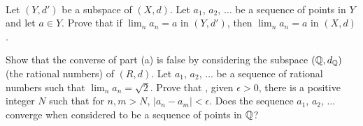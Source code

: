 \ea


\begin{comment}

\ExerciseSolution

\ba
\item Suppose to the contrary that there is an $n \in \Z^+$ such that $B_n \cap A = \emptyset$. Then there is no element $c \in A$ such that $d(x,c) < m + \frac{1}{n}$. This makes $m + \frac{1}{n}$ a lower bound for $\{d(x,a) \mid a \in A\}$ greater than the greatest lower bound of $\{d(x,a) \mid a \in A\}$. Since this cannot happen, we conclude that $B_n \cap A \neq \emptyset$ for every $n \in \Z^+$. 

\item We have
\[\lim d(x,a_n) \leq \lim \left(m+\frac{1}{n}\right) = m.\]
So we have found a sequence $(a_n)$ in $A$ satisfying $\lim d(x,a_n) = d(x,A)$.

\ea

\end{comment}

\item ~
	\ba
	\item Let $(Y,d')$ be a subspace of $(X,d)$. Let $a_1$, $a_2$, $\ldots$ be a sequence of points in $Y$ and let $a \in Y$. Prove that if $\lim_n a_n = a$ in $(Y,d')$, then $\lim_n a_n = a$ in $(X,d)$. 

	\item Show that the converse of part (a) is false by considering the subspace $(\mathbb{Q}, d_{\mathbb{Q}})$ (the rational numbers) of $(R,d)$. Let $a_1$, $a_2$, $\ldots$ be a sequence of rational numbers such that $\lim_n a_n = \sqrt{2}$. Prove that , given $\epsilon > 0$, there is a positive integer $N$ such that for $n, m > N$, $|a_n - a_m | < \epsilon$. Does the sequence  $a_1$, $a_2$, $\ldots$ converge when considered to be a sequence of points in $\mathbb{Q}$?  

	\ea

